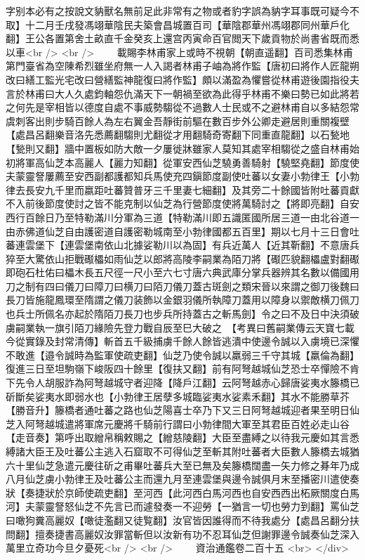 字别本必有之按說文豽獸名無前足此非常有之物或者豹字誤為豽字耳事既可疑今不取】十二月壬戌發馮翊華陰民夫築會昌城置百司【華陰郡華州馮翊郡同州華戶化翻】王公各置第舍土畝直千金癸亥上還宫丙寅命百官閲天下歲貢物於尚書省既而悉以車<br />
<br />
　　載賜李林甫家上或時不視朝【朝直遥翻】百司悉集林甫第門臺省為空陳希烈雖坐府無一人入謁者林甫子岫為將作監【唐初曰將作人匠龍朔改曰繕工監光宅改曰營繕監神龍復曰將作監】頗以滿盈為懼嘗從林甫遊後園指役夫言於林甫曰大人久處鈞軸怨仇滿天下一朝禍至欲為此得乎林甫不樂曰勢已如此將若之何先是宰相皆以德度自處不事威勢騶從不過數人士民或不之避林甫自以多結怨常虞刺客出則步騎百餘人為左右翼金吾靜街前驅在數百步外公卿走避居則重關複壁【處昌呂翻樂音洛先悉薦翻騶則尤翻從才用翻騎奇寄翻下同重直龍翻】以石甃地【甃則又翻】牆中置板如防大敵一夕屢徙牀雖家人莫知其處宰相騶從之盛自林甫始　初將軍高仙芝本高麗人【麗力知翻】從軍安西仙芝驍勇善騎射【驍堅堯翻】節度使夫蒙靈詧屢薦至安西副都護都知兵馬使充四鎭節度副使吐蕃以女妻小勃律王【小勃律去長安九千里而嬴距吐蕃贊普牙三千里妻七細翻】及其旁二十餘國皆附吐蕃貢獻不入前後節度使討之皆不能克制以仙芝為行營節度使將萬騎討之【將即亮翻】自安西行百餘日乃至特勒滿川分軍為三道【特勒滿川即五識匿國所居三道一由北谷道一由赤佛道仙芝自由護密道自護密勒城南至小勃律國都五百里】期以七月十三日會吐蕃連雲堡下【連雲堡南依山北據娑勒川以為固】有兵近萬人【近其靳翻】不意唐兵猝至大驚依山拒戰礟櫑如雨仙芝以郎將高陵李嗣業為陌刀將【礟匹貌翻櫑盧對翻礟即砲石杜佑曰櫑木長五尺徑一尺小至六七寸唐六典武庫分掌兵器辨其名數以備國用刀之制有四曰儀刀曰障刀曰横刀曰陌刀儀刀蓋古斑劍之類宋晉以來謂之御刀後魏曰長刀皆施龍鳳環至隋謂之儀刀装飾以金銀羽儀所執障刀蓋用以障身以禦敵横刀佩刀也兵士所佩名亦起於隋陌刀長刀也步兵所持蓋古之斬馬劍】令之曰不及日中決須破虜嗣業執一旗引陌刀緣險先登力戰自辰至巳大破之　【考異曰舊嗣業傳云天寶七載今從實錄及封常清傳】斬首五千級捕虜千餘人餘皆逃潰中使邊令誠以入虜境已深懼不敢進【邉令誠時為監軍使疏吏翻】仙芝乃使令誠以羸弱三千守其城【羸倫為翻】復進三日至坦駒嶺下峻阪四十餘里【復扶又翻】前有阿弩越城仙芝恐士卒憚險不肯下先令人胡服詐為阿弩越城守者迎降【降戶江翻】云阿弩越赤心歸唐娑夷水籐橋已斫斷矣娑夷水即弱水也【小勃律王居孽多城臨娑夷水娑素禾翻】其水不能勝草芥【勝音升】籐橋者通吐蕃之路也仙芝陽喜士卒乃下又三日阿弩越城迎者果至明日仙芝入阿弩越城遣將軍席元慶將千騎前行謂曰小勃律間大軍至其君臣百姓必走山谷【走音奏】第呼出取繒帛稱敕賜之【繒慈陵翻】大臣至盡縛之以待我元慶如其言悉縛諸大臣王及吐蕃公主逃入石窟取不可得仙芝至斬其附吐蕃者大臣數人籐橋去城猶六十里仙芝急遣元慶往斫之甫畢吐蕃兵大至已無及矣籐橋闊盡一矢力修之朞年乃成八月仙芝虜小勃律王及吐蕃公主而還九月至連雲堡與邊令誠俱月末至播密川遣使奏狀【奏捷狀於京師使疏吏翻】至河西【此河西白馬河西也自安西西出柘厥關度白馬河】夫蒙靈詧怒仙芝不先言已而遽發奏一不迎勞【一猶言一切也勞力到翻】罵仙芝曰噉狗糞高麗奴【噉徒濫翻又徒覧翻】汝官皆因誰得而不待我處分【處昌呂翻分扶問翻】擅奏捷書高麗奴汝罪當斬但以汝新有功不忍耳仙芝但謝罪邊令誠奏仙芝深入萬里立奇功今旦夕憂死<br />
<br />
　　資治通鑑卷二百十五  <br>
   </div> 

